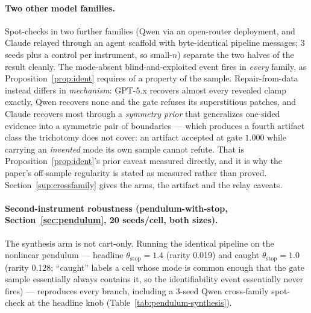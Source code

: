 \documentclass[11pt]{article}
\theoremstyle{definition}
\theoremstyle{remark}
\begin{document}
\paragraph{Two other model families.} Spot-checks in two further families (Qwen via an open-router deployment, and Claude relayed through an agent scaffold with byte-identical pipeline messages; 3 seeds plus a control per instrument, so small-$n$) separate the two halves of the result cleanly. The mode-absent blind-and-exploited event fires in \emph{every} family, as Proposition~\ref{prop:ident} requires of a property of the sample. Repair-from-data instead differs in \emph{mechanism}: GPT-5.x recovers almost every revealed clamp exactly, Qwen recovers none and the gate refuses its superstitious patches, and Claude recovers most through a \emph{symmetry prior} that generalizes one-sided evidence into a symmetric pair of boundaries --- which produces a fourth artifact class the trichotomy does not cover: an artifact accepted at gate $1.000$ while carrying an \emph{invented} mode its own sample cannot refute. That is Proposition~\ref{prop:ident}'s prior caveat measured directly, and it is why the paper's off-sample regularity is stated as measured rather than proved. Section~\ref{sup:crossfamily} gives the arms, the artifact and the relay caveats.

\paragraph{Second-instrument robustness (pendulum-with-stop, Section~\ref{sec:pendulum}, 20 seeds/cell, both sizes).} The synthesis arm is not cart-only. Running the identical pipeline on the nonlinear pendulum --- headline $\theta_\mathrm{stop} = 1.4$ (rarity 0.019) and caught $\theta_\mathrm{stop} = 1.0$ (rarity 0.128; ``caught'' labels a cell whose mode is common enough that the gate sample essentially always contains it, so the identifiability event essentially never fires) --- reproduces every branch, including a 3-seed Qwen cross-family spot-check at the headline knob (Table~\ref{tab:pendulum-synthesis}).
\end{document}
